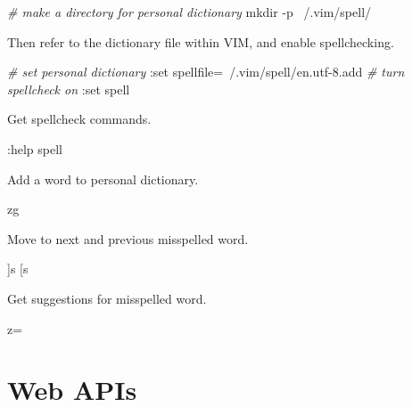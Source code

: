 \documentclass[]{book}
\newenvironment{Shaded}{\begin{snugshade}}{\end{snugshade}}
\newcommand{\CommentTok}[1]{\textcolor[rgb]{0.56,0.35,0.01}{\textit{#1}}}
\newcommand{\ExtensionTok}[1]{#1}
\newcommand{\FunctionTok}[1]{\textcolor[rgb]{0.00,0.00,0.00}{#1}}
\newcommand{\NormalTok}[1]{#1}
\newcommand{\VariableTok}[1]{\textcolor[rgb]{0.00,0.00,0.00}{#1}}
\begin{document}
\begin{Shaded}
\begin{Highlighting}[]
\CommentTok{# make a directory for personal dictionary}
\FunctionTok{mkdir}\NormalTok{ -p ~/.vim/spell/}
\end{Highlighting}
\end{Shaded}

Then refer to the dictionary file within VIM, and enable spellchecking.

\begin{Shaded}
\begin{Highlighting}[]
\CommentTok{# set personal dictionary}
\NormalTok{:}\ExtensionTok{set}\NormalTok{ spellfile=~/.vim/spell/en.utf-8.add}
\CommentTok{# turn spellcheck on}
\NormalTok{:}\ExtensionTok{set}\NormalTok{ spell}
\end{Highlighting}
\end{Shaded}

Get spellcheck commands.

\begin{Shaded}
\begin{Highlighting}[]
\NormalTok{:}\ExtensionTok{help}\NormalTok{ spell}
\end{Highlighting}
\end{Shaded}

Add a word to personal dictionary.

\begin{Shaded}
\begin{Highlighting}[]
\ExtensionTok{zg}
\end{Highlighting}
\end{Shaded}

Move to next and previous misspelled word.

\begin{Shaded}
\begin{Highlighting}[]
\NormalTok{]}\ExtensionTok{s}
\NormalTok{[}\ExtensionTok{s}
\end{Highlighting}
\end{Shaded}

Get suggestions for misspelled word.

\begin{Shaded}
\begin{Highlighting}[]
\VariableTok{z=}
\end{Highlighting}
\end{Shaded}

\hypertarget{apis}{%
\chapter{Web APIs}\label{apis}}
\end{document}
